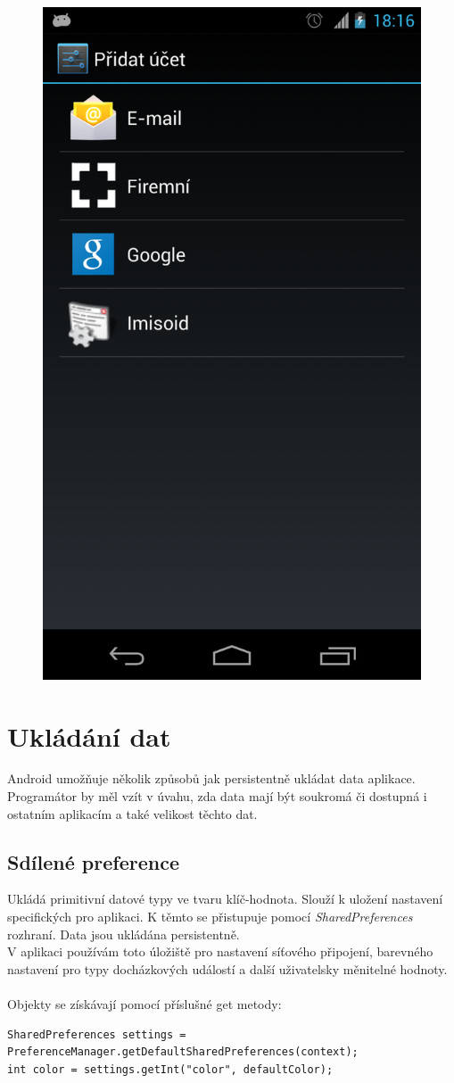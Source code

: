 \documentclass{diplomka}
\begin{document}
\begin{figure}[H]
\begin{minipage}{.5\textwidth}
  \includegraphics[width=.75\linewidth]{scr/addacc.png}
  \label{obr:addacc}
\end{minipage}
\end{figure}




\section{Ukládání dat}
Android umožňuje několik způsobů jak persistentně ukládat data aplikace. Programátor by měl vzít v úvahu, zda data mají být soukromá či dostupná i ostatním aplikacím a také velikost těchto dat. 
\subsection*{Sdílené preference} Ukládá primitivní datové typy ve tvaru klíč-hodnota. Slouží k uložení nastavení specifických pro aplikaci. K těmto se přistupuje pomocí \emph{SharedPreferences} rozhraní. Data jsou ukládána persistentně. \\ V aplikaci používám toto úložiště pro nastavení síťového připojení, barevného nastavení pro typy docházkových událostí a další uživatelsky měnitelné hodnoty.\\ \\
Objekty se získávají pomocí příslušné get metody:
\begin{lstlisting}
SharedPreferences settings = PreferenceManager.getDefaultSharedPreferences(context);
int color = settings.getInt("color", defaultColor);
\end{lstlisting}
\end{document}
